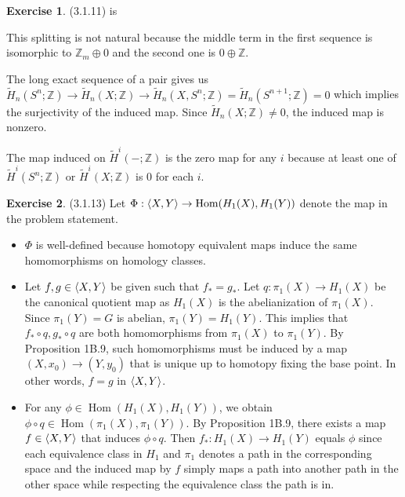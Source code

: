 \documentclass[12pt, psamsfonts]{amsart}
\theoremstyle{definition}
\newtheorem*{exer}{Exercise}
\theoremstyle{remark}
\DeclareMathOperator{\Hom}{Hom}
\numberwithin{equation}{section}
\begin{document}
\begin{exer}{(3.1.11)}
  is

  \begin{center}
  \end{center}

  This splitting is not natural because the middle term in the first sequence is isomorphic to $\mathbb{Z}_m \oplus 0$ and the second one is $0 \oplus \mathbb{Z}$.


  The long exact sequence of a pair gives us $\tilde{H}_n(S^n; \mathbb{Z}) \rightarrow \tilde{H}_n(X; \mathbb{Z}) \rightarrow \tilde{H}_n(X, S^n; \mathbb{Z}) = \tilde{H}_n(S^{n + 1}; \mathbb{Z}) = 0$ which implies the surjectivity of the induced map.
  Since $\tilde{H}_n(X; \mathbb{Z}) \ne 0$, the induced map is nonzero.

  The map induced on $\tilde{H}^i(-;\mathbb{Z})$ is the zero map for any $i$ because at least one of $\tilde{H}^i(S^n; \mathbb{Z})$ or $\tilde{H}^i(X; \mathbb{Z})$ is 0 for each $i$.
\end{exer}

\begin{exer}{(3.1.13)}
  Let $\Phi: \ev{X, Y} \rightarrow \Hom(H_1(X), H_1(Y))$ denote the map in the problem statement.
  \begin{itemize}
    \item
      $\Phi$ is well-defined because homotopy equivalent maps induce the same homomorphisms on homology classes.
    \item
      Let $f, g \in \ev{X, Y}$ be given such that $f_{\ast} = g_{\ast}$.
      Let $q: \pi_1(X) \rightarrow H_1(X)$ be the canonical quotient map as $H_1(X)$ is the abelianization of $\pi_1(X)$.
      Since $\pi_1(Y) = G$ is abelian, $\pi_1(Y) = H_1(Y)$.
      This implies that $f_{\ast} \circ q, g_{\ast} \circ q$ are both homomorphisms from $\pi_1(X)$ to $\pi_1(Y)$.
      By Proposition 1B.9, such homomorphisms must be induced by a map $(X, x_0) \rightarrow (Y, y_0)$ that is unique up to homotopy fixing the base point.
      In other words, $f = g$ in $\ev{X, Y}$.
    \item
      For any $\phi \in \Hom(H_1(X), H_1(Y))$, we obtain $\phi \circ q \in \Hom(\pi_1(X), \pi_1(Y))$.
      By Proposition 1B.9, there exists a map $f \in \ev{X, Y}$ that induces $\phi \circ q$.
      Then $f_{\ast}: H_1(X) \rightarrow H_1(Y)$ equals $\phi$ since each equivalence class in $H_1$ and $\pi_1$ denotes a path in the corresponding space and the induced map by $f$ simply maps a path into another path in the other space while respecting the equivalence class the path is in.
  \end{itemize}
\end{exer}
\end{document}
